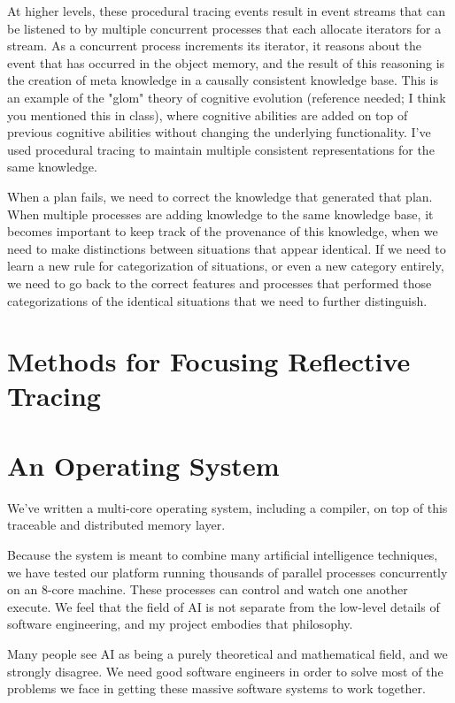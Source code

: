 At higher levels, these procedural tracing events result in event
streams that can be listened to by multiple concurrent processes that
each allocate iterators for a stream.  As a concurrent process
increments its iterator, it reasons about the event that has occurred in
the object memory, and the result of this reasoning is the creation of
meta knowledge in a causally consistent knowledge base.  This is an
example of the "glom" theory of cognitive evolution (reference needed; I
think you mentioned this in class), where cognitive abilities are added
on top of previous cognitive abilities without changing the underlying
functionality.  I've used procedural tracing to maintain multiple
consistent representations for the same knowledge.

When a plan fails, we need to correct the knowledge that generated that
plan.  When multiple processes are adding knowledge to the same
knowledge base, it becomes important to keep track of the provenance of
this knowledge, when we need to make distinctions between situations
that appear identical.  If we need to learn a new rule for
categorization of situations, or even a new category entirely, we need
to go back to the correct features and processes that performed those
categorizations of the identical situations that we need to further
distinguish.

\section{Methods for Focusing Reflective Tracing}
\label{sec:methods_for_focusing_reflective_tracing}


\section{An Operating System}

We've written a multi-core operating system, including a
compiler, on top of this traceable and distributed memory layer.

Because the system is meant to combine many artificial intelligence
techniques, we have tested our platform running thousands of parallel
processes concurrently on an 8-core machine.  These processes can
control and watch one another execute.  We feel that the field of AI
is not separate from the low-level details of software engineering,
and my project embodies that philosophy.

Many people see AI as being a purely theoretical and mathematical
field, and we strongly disagree.  We need good software engineers in
order to solve most of the problems we face in getting these massive
software systems to work together.

